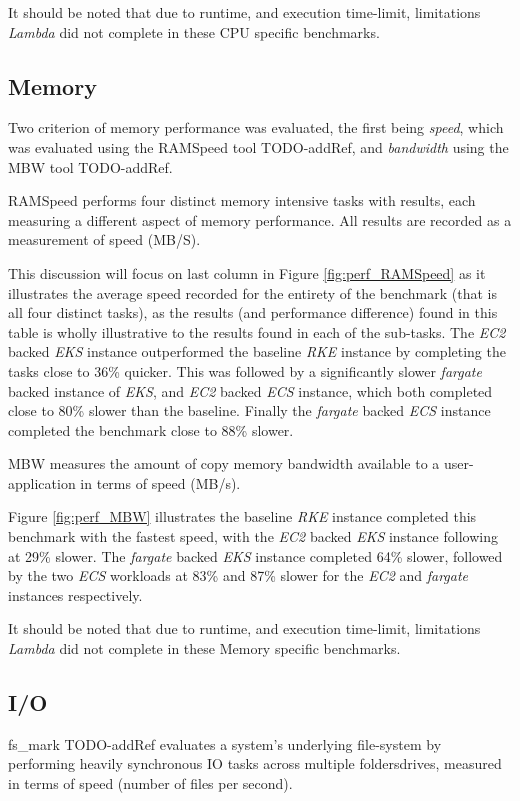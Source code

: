 \noindent \newline It should be noted that due to runtime, and execution time-limit, limitations \textit{Lambda} did not complete in these CPU specific benchmarks.

\subsection{Memory}
Two criterion of memory performance was evaluated, the first being \emph{speed},
which was evaluated using the RAMSpeed tool TODO-addRef, and \emph{bandwidth} using the MBW tool TODO-addRef.

RAMSpeed performs four distinct memory intensive tasks with results, each measuring a different aspect of memory performance.
All results are recorded as a measurement of speed (MB/S).

This discussion will focus on last column in Figure \ref{fig:perf_RAMSpeed} as it illustrates the average speed recorded for the entirety of the benchmark (that is all four distinct tasks),
as the results (and performance difference) found in this table is wholly illustrative to the results found in each of the sub-tasks.
The \textit{EC2} backed \textit{EKS} instance outperformed the baseline \textit{RKE} instance by completing the tasks close to 36\% quicker.
This was followed by a significantly slower \textit{fargate} backed instance of \textit{EKS}, and \textit{EC2} backed \textit{ECS} instance,
which both completed close to 80\% slower than the baseline.
Finally the \textit{fargate} backed \textit{ECS} instance completed the benchmark close to 88\% slower.

\noindent \newline MBW measures the amount of copy memory bandwidth available to a user-application in terms of speed (MB/s).

Figure \ref{fig:perf_MBW} illustrates the baseline \textit{RKE} instance completed this benchmark with the fastest speed, with the \textit{EC2} backed \textit{EKS} instance following at 29\% slower.
The \textit{fargate} backed \textit{EKS} instance completed 64\% slower,
followed by the two \textit{ECS} workloads at 83\% and 87\% slower for the \textit{EC2} and \textit{fargate} instances respectively.

\noindent \newline It should be noted that due to runtime, and execution time-limit, limitations \textit{Lambda} did not complete in these Memory specific benchmarks.

\subsection{I/O}
fs\_mark TODO-addRef evaluates a system's underlying file-system by performing heavily synchronous IO tasks across multiple folders\/drives, measured in terms of speed (number of files per second).

